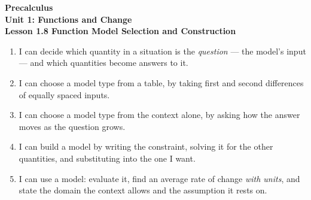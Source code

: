 \documentclass[10pt]{article}
\begin{document}
\vspace{-0.8in}

\begin{center}
  {\color{white}\textbf{\LARGE Precalculus}}\\[4pt]
  {\color{lilacmid}\large\textbf{Unit 1: Functions and Change}}\\[6pt]
  {\color{white}\textbf{\large Lesson 1.8 \quad Function Model Selection and Construction}}
\end{center}

\vspace{0.22in}
\namedateperiod
\vspace{0.18in}

\begin{learningtargetbox}
\small
\begin{enumerate}[leftmargin=1.5em, itemsep=5pt]
  \item I can decide which quantity in a situation is the \textit{question} ---
        the model's input --- and which quantities become answers to it.
  \item I can choose a model type from a table, by taking first and second
        differences of equally spaced inputs.
  \item I can choose a model type from the context alone, by asking how the
        answer moves as the question grows.
  \item I can build a model by writing the constraint, solving it for the other
        quantities, and substituting into the one I want.
  \item I can use a model: evaluate it, find an average rate of change
        \textit{with units}, and state the domain the context allows and the
        assumption it rests on.
\end{enumerate}
\end{learningtargetbox}

\vspace{0.14in}
\end{document}
